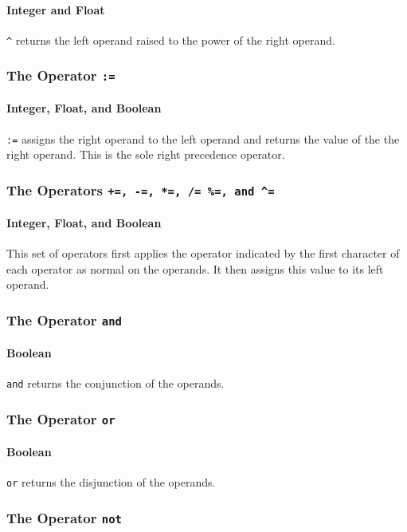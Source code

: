 \paragraph{Integer and Float}
\verb!^! returns the left operand raised to the power of the right operand.

\subsubsection{The Operator {\tt :=}}
\paragraph{Integer, Float, and Boolean}
\verb!:=! assigns the right operand to the left operand and returns the value of the the right operand. This is the sole right precedence operator.

\subsubsection{The Operators {\tt +=, -=, *=, /= \%=, and \textasciicircum=}}
\paragraph{Integer, Float, and Boolean}
This set of operators first applies the operator indicated by the first character of each operator as normal on the operands. It then assigns this value to its left operand.

\subsubsection{The Operator {\tt and}}
\paragraph{Boolean}
\verb!and! returns the conjunction of the operands.

\subsubsection{The Operator {\tt or}}
\paragraph{Boolean}
\verb!or! returns the disjunction of the operands.

\subsubsection{The Operator {\tt not}}
